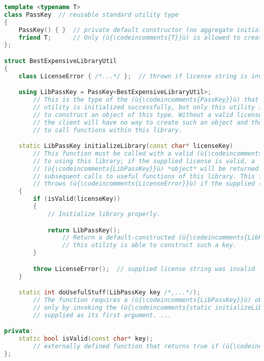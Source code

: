\begin{lstlisting}[language=C++]
template <typename T>
class PassKey  // reusable standard utility type
{
    PassKey() { }  // private default constructor (no aggregate initialization)
    friend T;      // Only (ù{\codeincomments{T}}ù) is allowed to create this object.
};

struct BestExpensiveLibraryUtil
{
    class LicenseError { /*...*/ };  // thrown if license string is invalid

    using LibPassKey = PassKey<BestExpensiveLibraryUtil>;
        // This is the type of the (ù{\codeincomments{PassKey}}ù) that will be returned when this
        // utility is initialized successfully, but only this utility is able 
        // to construct an object of this type. Without a valid license string,
        // the client will have no way to create such an object and thus no way
        // to call functions within this library.

    static LibPassKey initializeLibrary(const char* licenseKey)
        // This function must be called with a valid (ù{\codeincomments{licenseKey}}ù) string prior
        // to using this library; if the supplied license is valid, a
        // (ù{\codeincomments{LibPassKey}}ù) *object* will be returned for mandatory use in *all*
        // subsequent calls to useful functions of this library. This function
        // throws (ù{\codeincomments{LicenseError}}ù) if the supplied (ù{\codeincomments{licenseKey}}ù) string is invalid.
    {
        if (isValid(licenseKey))
        {
            // Initialize library properly.

            return LibPassKey();
                // Return a default-constructed (ù{\codeincomments{LibPassKey}}ù). Note that only
                // this utility is able to construct such a key.
        }

        throw LicenseError();  // supplied license string was invalid
    }

    static int doUsefulStuff(LibPassKey key /*,...*/);
        // The function requires a (ù{\codeincomments{LibPassKey}}ù) object, which can be constructed
        // only by invoking the (ù{\codeincomments{static initializeLibrary}}ù) function, to be
        // supplied as its first argument. ...

private:
    static bool isValid(const char* key);
        // externally defined function that returns true if (ù{\codeincomments{key}}ù) is valid
};
\end{lstlisting}
    
